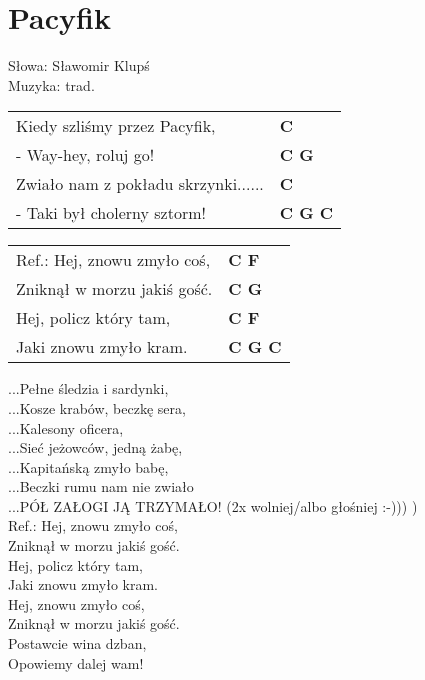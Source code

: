 \section{Pacyfik}

Słowa: Sławomir Klupś\\
Muzyka:  trad.

\vspace{2em}
\begin{tabular}{@{}p{9cm}@{}l@{}}
Kiedy szliśmy przez Pacyfik, & \bfseries  C \\
- Way-hey, roluj go! & \bfseries  C G \\
Zwiało nam z pokładu skrzynki......  & \bfseries  C \\
- Taki był cholerny sztorm! & \bfseries  C G C \\
\end{tabular}

\vspace{1em}
\begin{tabular}{@{}p{9cm}@{}l@{}}
Ref.: Hej, znowu zmyło coś, & \bfseries  C F \\
Zniknął w morzu jakiś gość. & \bfseries C G \\
Hej, policz który tam, & \bfseries C F \\
Jaki znowu zmyło kram. & \bfseries C G C \\
\end{tabular}

\vspace{1em}
   ...Pełne śledzia i sardynki, \\
   ...Kosze krabów, beczkę sera, \\
   ...Kalesony oficera, \\
   ...Sieć jeżowców, jedną żabę, \\
   ...Kapitańską zmyło babę, \\
   ...Beczki rumu nam nie zwiało \\
   ...PÓŁ ZAŁOGI JĄ TRZYMAŁO!  (2x wolniej/albo głośniej :-))) ) \\

Ref.: Hej, znowu zmyło coś, \\
Zniknął w morzu jakiś gość. \\
Hej, policz który tam, \\
Jaki znowu zmyło kram. \\

Hej, znowu zmyło coś, \\
Zniknął w morzu jakiś gość. \\
Postawcie wina dzban, \\
Opowiemy dalej wam!